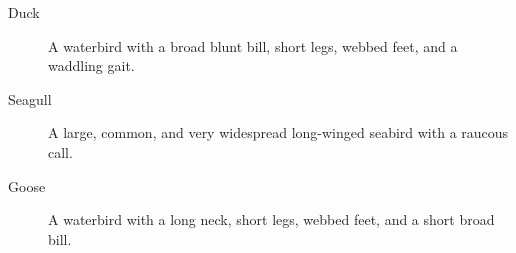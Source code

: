 \documentclass{article}
\begin{document}
\begin{description}
  \item[Duck] A waterbird with a broad blunt bill, short legs, webbed feet, and a waddling gait.
  \item[Seagull] A large, common, and very widespread long-winged seabird with a raucous call.
  \item[Goose] A waterbird with a long neck, short legs, webbed feet, and a short broad bill.
\end{description}
\end{document}
